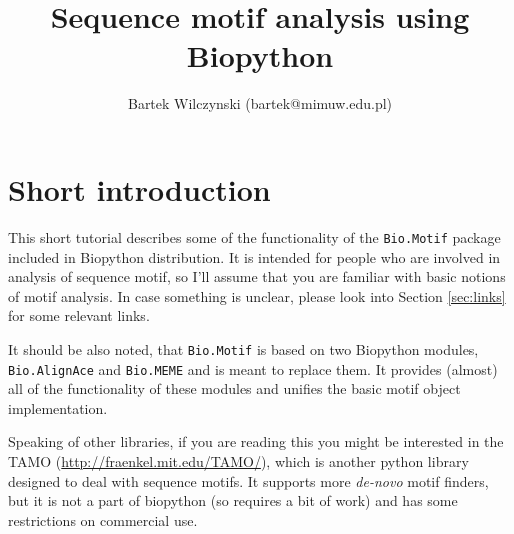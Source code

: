 \documentclass{article}
\begin{document}
\title{Sequence motif analysis using  Biopython}
\author{Bartek Wilczynski (bartek@mimuw.edu.pl)}

\maketitle
\tableofcontents

\section{Short introduction}
\label{sec:intro}
This short tutorial describes some of the functionality of the
\verb|Bio.Motif| package included in Biopython distribution. It is intended
for people who are involved in analysis of sequence motif, so I'll
assume that you are familiar with basic notions of motif analysis. In
case something is unclear, please look into Section \ref{sec:links}
for some relevant links.

It should be also noted, that \verb|Bio.Motif| is based on two
Biopython modules, \verb|Bio.AlignAce| and \verb|Bio.MEME| and is
meant to replace them. It provides (almost) all of the functionality
of these modules and unifies the basic motif object implementation.

Speaking of other libraries, if you are reading this you might be
interested in the TAMO \cite{tamo}
(\url{http://fraenkel.mit.edu/TAMO/}), which is another python library
designed to deal with sequence motifs. It supports more \emph{de-novo}
motif finders, but it is not a part of biopython (so requires a bit of
work) and has some restrictions on commercial use.
\end{document}
